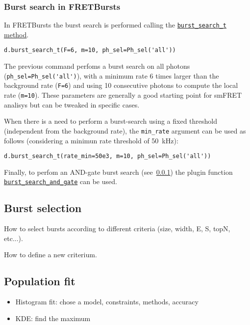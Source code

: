 \subsubsection{Burst search in FRETBursts}
\label{sec:burstsearch-intro}

In FRETBursts the burst search is performed calling the \href{http://fretbursts.readthedocs.org/en/latest/data_class.html#fretbursts.burstlib.Data.burst_search_t}{\verb|burst_search_t| method}.

\begin{verbatim}
d.burst_search_t(F=6, m=10, ph_sel=Ph_sel('all'))
\end{verbatim}

The previous command perfoms a burst search on all photons (\verb|ph_sel=Ph_sel('all')|), with a minimum rate 6 times larger than the background rate (\verb|F=6|) and using 10 consecutive photons to compute the local rate (\verb|m=10|).
These parameters are generally a good starting point for smFRET analisys but can be tweaked in specific cases.

When there is a need to perform a burst-search using a fixed threshold (independent from the background rate), 
the \verb|min_rate| argument can be used as follows (considering a minimun rate threshold of 50~kHz):

\begin{verbatim}
d.burst_search_t(rate_min=50e3, m=10, ph_sel=Ph_sel('all'))
\end{verbatim}

Finally, to perfom an AND-gate burst search (see~\ref{sec:burstsearch-intro}) the plugin function \href{http://fretbursts.readthedocs.org/en/latest/plugins.html#fretbursts.burstlib_ext.burst_search_and_gate}{\verb|burst_search_and_gate|} can be used.

\subsection{Burst selection}

How to select bursts according to different criteria (size, width, E, S, topN, etc...).

How to define a new criterium.


\subsection{Population fit}

\begin{itemize}
\item Histogram fit: chose a model, constraints, methods, accuracy
\item KDE: find the maximum
\end{itemize}

